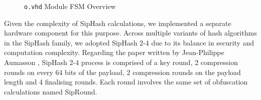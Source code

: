 \documentclass[a4paper]{report}
\newcommand{\code}{\texttt}
\begin{document}
\begin{figure}[h!]
\begin{minipage}{.45\textwidth}
  \caption{\code{o.vhd} Module FSM Overview}
  \label{fig:coreout-fsm}
\end{minipage}
\end{figure}

Given the complexity of SipHash calculations, we implemented a separate hardware component for this purpose. Across multiple variants of hash algorithms in the SipHash family, we adopted SipHash 2-4 due to its balance in security and computation complexity. Regarding the paper written by Jean-Philippe Aumasson \cite{aumasson-bernstein-2012}, SipHash 2-4 process is comprised of a key round, 2 compression rounds on every 64 bits of the payload, 2 compression rounds on the payload length and 4 finalising rounds. Each round involves the same set of obfuscation calculations named SipRound.
\end{document}
